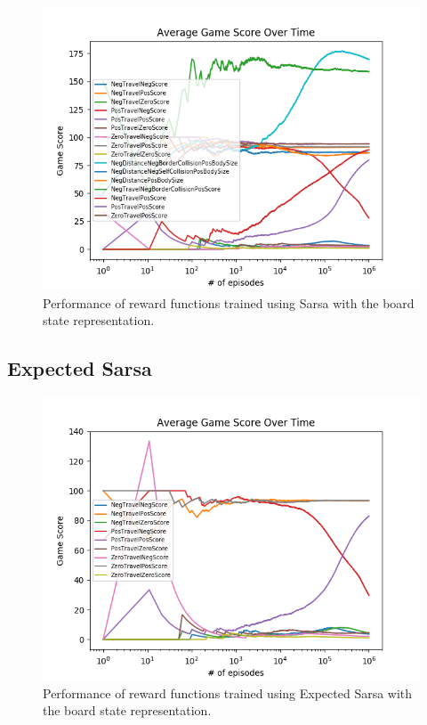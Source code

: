 \documentclass[result.tex]{subfiles}
\begin{document}
    \begin{figure}[ht]
        \centering
        \includegraphics[width=\linewidth]{../images/sarsa/reward/234/board_state_average_game_score_over_time.png}
        \caption{Performance of reward functions trained using Sarsa with the board state representation.}
        \label{fig:app_reward_sarsa}
    \end{figure}

    \newpage

    \subsection{Expected Sarsa}

    \begin{figure}[ht]
        \centering
        \includegraphics[width=\linewidth]{../images/expected_sarsa/reward/234/board_state_average_game_score_over_time.png}
        \caption{Performance of reward functions trained using Expected Sarsa with the board state representation.}
        \label{fig:app_reward_expected_sarsa}
    \end{figure}
\end{document}
